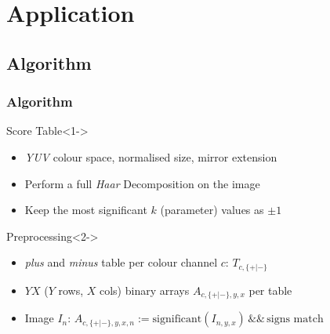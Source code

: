 \documentclass{beamer}
\begin{document}
\section{Application}
\subsection{Algorithm}

\begin{frame}
  \frametitle{Algorithm}

  \begin{block}{Score Table}<1->
    \begin{itemize}
    \item \emph{YUV} colour space, normalised size, mirror extension
    \item Perform a full \emph{Haar} Decomposition on the image
    \item Keep the most significant $k$ (parameter) values as $\pm 1$
    \end{itemize}
  \end{block}

  \begin{block}{Preprocessing}<2->
    \begin{itemize}
    \item \emph{plus} and \emph{minus} table per colour channel $c$:
      $T_{c,\{+|-\}}$
    \item $YX$ ($Y$ rows, $X$ cols) binary arrays $A_{c,\{+|-\},y,x}$ per table
    \item Image $I_n$: $A_{c,\{+|-\},y,x,n} :=
      \mbox{significant}(I_{n,y,x}) \,\&\&\, \mbox{signs match}$
    \end{itemize}
  \end{block}

\end{frame}
\end{document}
